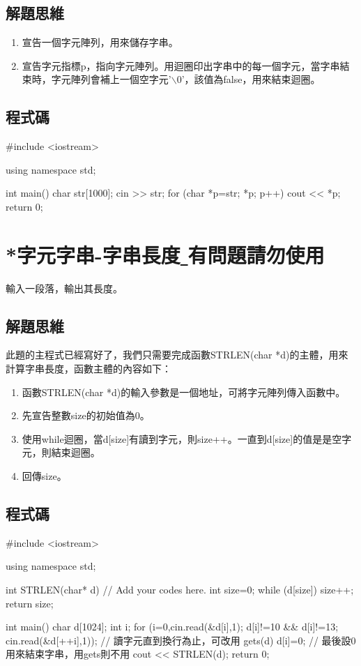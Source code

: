 \subsection{解題思維}
\begin{enumerate}
	\item 宣告一個字元陣列，用來儲存字串。
	\item 宣告字元指標p，指向字元陣列。用迴圈印出字串中的每一個字元，當字串結束時，字元陣列會補上一個空字元'$\backslash$0’，該值為false，用來結束迴圈。
\end{enumerate}


\subsection{程式碼}
\begin{cppcode}
	#include <iostream>
	
	using namespace std;
	
	int main()
	{
		char str[1000];
		cin >> str;
		for (char *p=str; *p; p++) cout << *p;
		return 0;
	}	
\end{cppcode}

\section{*字元字串-字串長度\underline{ }有問題請勿使用}
輸入一段落，輸出其長度。

\subsection{解題思維}
此題的主程式已經寫好了，我們只需要完成函數STRLEN(char *d)的主體，用來計算字串長度，函數主體的內容如下：
\begin{enumerate}
	\item 函數STRLEN(char *d)的輸入參數是一個地址，可將字元陣列傳入函數中。
	\item 先宣告整數size的初始值為0。
	\item 使用while迴圈，當d[size]有讀到字元，則size++。一直到d[size]的值是是空字元，則結束迴圈。
	\item 回傳size。
\end{enumerate}


\subsection{程式碼}
\begin{cppcode}
	#include <iostream>
	
	using namespace std; 
	
	int STRLEN(char* d)
	{
		// Add your codes here.
		int size=0;
		while (d[size]) size++;
		return size;
	}

	int main()
	{ 
		char d[1024];
		int i;
		for (i=0,cin.read(&d[i],1); d[i]!=10 && d[i]!=13; cin.read(&d[++i],1)); // 讀字元直到換行為止，可改用 gets(d)
		d[i]=0; // 最後設0用來結束字串，用gets則不用
		cout << STRLEN(d);
		return 0;
	} 	
\end{cppcode}

